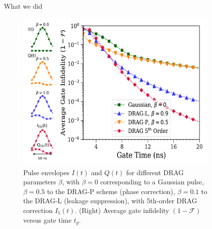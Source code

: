 \documentclass[final]{beamer}
\newlength{\sepwidth}
\newlength{\colwidth}
\newcommand{\separatorcolumn}{\begin{column}{\sepwidth}\end{column}}
\begin{document}
\begin{frame}[t]
\begin{columns}[t]
\begin{column}{\colwidth}
\begin{block}{What we did}
                \begin{figure}
                    \centering
                    \includegraphics[width=0.6\linewidth]{Images_pdfs/IWQT_gauss_pulse-fidelity.pdf}
                    \caption{Pulse envelopes \(I(t)\) and \(Q(t)\) for different DRAG parameters \(\beta\), with \(\beta=0\) corresponding to a Gaussian pulse, \(\beta=0.5\) to the DRAG-P scheme (phase correction), \(\beta=0.1\) to the DRAG-L (leakage suppression), with 5th-order DRAG correction \(I_5(t)\). (Right) Average gate infidelity \((1-\mathcal{F})\) versus gate time \(t_g\).}
                \end{figure}
            \end{block}

        \end{column}

        \separatorcolumn
        \begin{column}{\colwidth}


\end{column}
\end{columns}
\end{frame}
\end{document}
